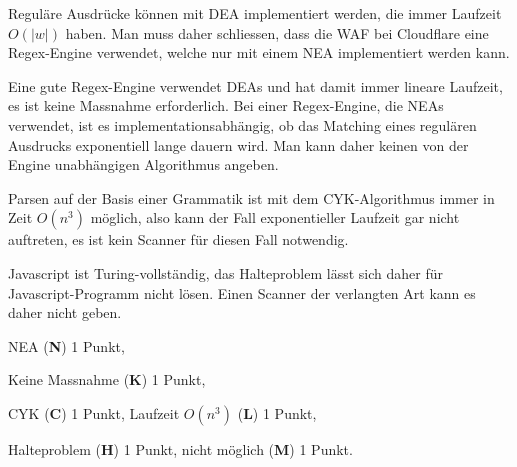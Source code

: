 \begin{loesung}
\begin{teilaufgaben}
\item
Reguläre Ausdrücke können mit DEA implementiert werden,
die immer Laufzeit $O(|w|)$ haben. 
Man muss daher schliessen, dass die WAF bei Cloudflare eine
Regex-Engine verwendet, welche nur mit einem NEA implementiert
werden kann.
\item
Eine gute Regex-Engine verwendet DEAs und hat damit immer lineare Laufzeit,
es ist keine Massnahme erforderlich.
Bei einer Regex-Engine, die NEAs verwendet, ist es implementationsabhängig,
ob das Matching eines regulären Ausdrucks exponentiell lange dauern wird.
Man kann daher keinen von der Engine unabhängigen Algorithmus angeben.
\item
Parsen auf der Basis einer Grammatik ist mit dem CYK-Algorithmus immer
in Zeit $O(n^3)$ möglich, also kann der Fall exponentieller Laufzeit
gar nicht auftreten, es ist kein Scanner für diesen Fall notwendig.
\item
Javascript ist Turing-vollständig, das Halteproblem lässt sich daher
für Javascript-Programm nicht lösen.
Einen Scanner der verlangten Art kann es daher nicht geben.
\qedhere
\end{teilaufgaben}
\end{loesung}

\begin{bewertung}
\begin{teilaufgaben}
\item NEA ({\bf N}) 1 Punkt,
\item Keine Massnahme ({\bf K}) 1 Punkt,
\item CYK ({\bf C}) 1 Punkt, Laufzeit $O(n^3)$ ({\bf L}) 1 Punkt,
\item Halteproblem ({\bf H}) 1 Punkt, nicht  möglich ({\bf M}) 1 Punkt.
\end{teilaufgaben}
\end{bewertung}

